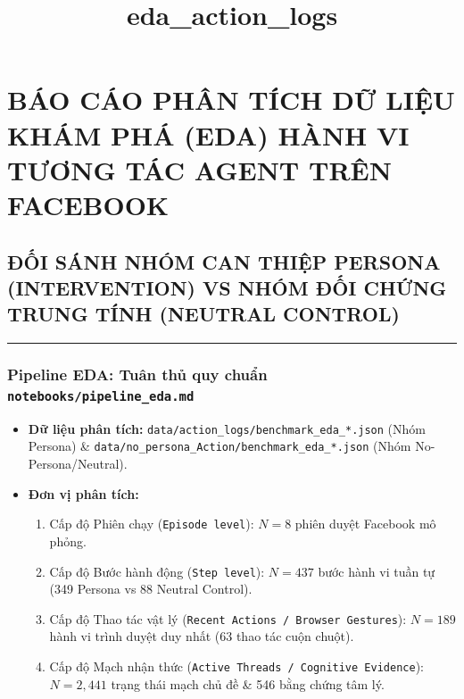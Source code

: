 \documentclass[11pt]{article}
\title{eda\_action\_logs}
\providecommand{\tightlist}{%
      \setlength{\itemsep}{0pt}\setlength{\parskip}{0pt}}
\begin{document}
    
    \maketitle
    
    

    
    \section{BÁO CÁO PHÂN TÍCH DỮ LIỆU KHÁM PHÁ (EDA) HÀNH VI TƯƠNG TÁC
AGENT TRÊN
FACEBOOK}\label{buxe1o-cuxe1o-phuxe2n-tuxedch-dux1eef-liux1ec7u-khuxe1m-phuxe1-eda-huxe0nh-vi-tux1b0ux1a1ng-tuxe1c-agent-truxean-facebook}

\subsection{ĐỐI SÁNH NHÓM CAN THIỆP PERSONA (INTERVENTION) VS NHÓM ĐỐI
CHỨNG TRUNG TÍNH (NEUTRAL
CONTROL)}\label{ux111ux1ed1i-suxe1nh-nhuxf3m-can-thiux1ec7p-persona-intervention-vs-nhuxf3m-ux111ux1ed1i-chux1ee9ng-trung-tuxednh-neutral-control}

\begin{center}\rule{0.5\linewidth}{0.5pt}\end{center}

\subsubsection{\texorpdfstring{Pipeline EDA: Tuân thủ quy chuẩn
\texttt{notebooks/pipeline\_eda.md}}{Pipeline EDA: Tuân thủ quy chuẩn notebooks/pipeline\_eda.md}}\label{pipeline-eda-tuuxe2n-thux1ee7-quy-chuux1ea9n-notebookspipeline_eda.md}

\begin{itemize}
\tightlist
\item
  \textbf{Dữ liệu phân tích:}
  \texttt{data/action\_logs/benchmark\_eda\_*.json} (Nhóm Persona) \&
  \texttt{data/no\_persona\_Action/benchmark\_eda\_*.json} (Nhóm
  No-Persona/Neutral).
\item
  \textbf{Đơn vị phân tích:}

  \begin{enumerate}
  \def\labelenumi{\arabic{enumi}.}
  \tightlist
  \item
    Cấp độ Phiên chạy (\texttt{Episode\ level}): \(N = 8\) phiên duyệt
    Facebook mô phỏng.
  \item
    Cấp độ Bước hành động (\texttt{Step\ level}): \(N = 437\) bước hành
    vi tuần tự (349 Persona vs 88 Neutral Control).
  \item
    Cấp độ Thao tác vật lý
    (\texttt{Recent\ Actions\ /\ Browser\ Gestures}): \(N = 189\) hành
    vi trình duyệt duy nhất (63 thao tác cuộn chuột).
  \item
    Cấp độ Mạch nhận thức
    (\texttt{Active\ Threads\ /\ Cognitive\ Evidence}): \(N = 2,441\)
    trạng thái mạch chủ đề \& 546 bằng chứng tâm lý.
  \end{enumerate}
\end{itemize}
\end{document}
